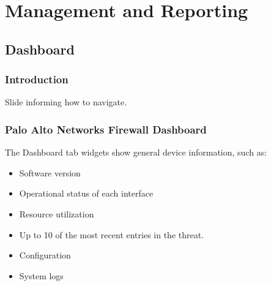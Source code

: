 \section{Management and Reporting}
\subsection{Dashboard}
\subsubsection{Introduction}
Slide informing how to navigate.

\subsubsection{Palo Alto Networks Firewall Dashboard}
The Dashboard tab widgets show general device information, such as:
\begin{itemize}
    \item Software version
    \item Operational status of each interface
    \item Resource utilization
    \item Up to 10 of the most recent entries in the threat.
    \item Configuration
    \item System logs
\end{itemize}

